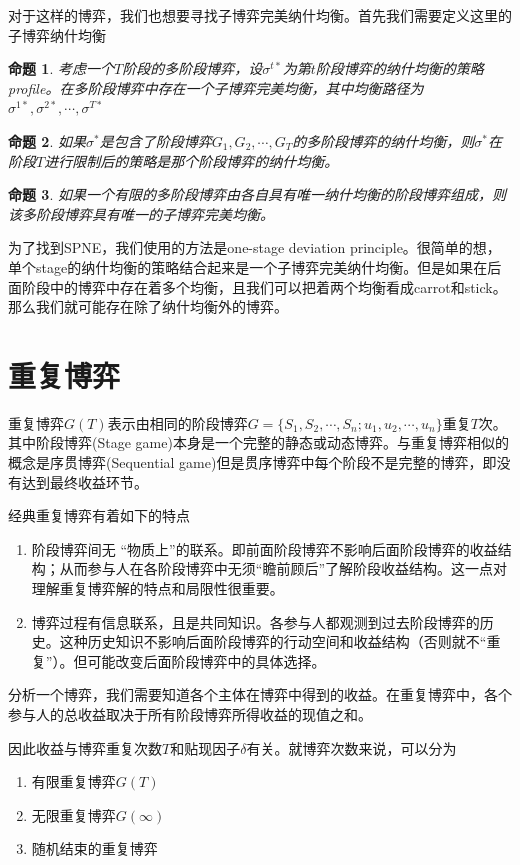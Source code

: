 \documentclass[UTF8,12pt]{ctexart}
\newtheorem{Prop}{命题}[section]
\numberwithin{equation}{section} %
\numberwithin{figure}{section}
\numberwithin{table}{section}
\begin{document}
	对于这样的博弈，我们也想要寻找子博弈完美纳什均衡。首先我们需要定义这里的子博弈纳什均衡
	\begin{Prop}
		考虑一个$T$阶段的多阶段博弈，设$\sigma^{t*}$为第$t$阶段博弈的纳什均衡的策略profile。在多阶段博弈中存在一个子博弈完美均衡，其中均衡路径为$\sigma^{1*},\sigma^{2*},\cdots,\sigma^{T*}$
	\end{Prop}
	\begin{Prop}
		如果$\sigma^*$是包含了阶段博弈$G_1,G_2,\cdots,G_T$的多阶段博弈的纳什均衡，则$\sigma^*$在阶段$T$进行限制后的策略是那个阶段博弈的纳什均衡。
	\end{Prop}
	\begin{Prop}
		如果一个有限的多阶段博弈由各自具有唯一纳什均衡的阶段博弈组成，则该多阶段博弈具有唯一的子博弈完美均衡。
	\end{Prop}
	
	为了找到SPNE，我们使用的方法是one-stage deviation principle。很简单的想，单个stage的纳什均衡的策略结合起来是一个子博弈完美纳什均衡。但是如果在后面阶段中的博弈中存在着多个均衡，且我们可以把着两个均衡看成carrot和stick。那么我们就可能存在除了纳什均衡外的博弈。
	
	\newpage
	
	\section{重复博弈}
	
	重复博弈$G(T)$表示由相同的阶段博弈$G = \{S_1,S_2,\cdots,S_n;u_1,u_2,\cdots,u_n\}$重复$T$次。其中阶段博弈(Stage game)本身是一个完整的静态或动态博弈。与重复博弈相似的概念是序贯博弈(Sequential game)但是贯序博弈中每个阶段不是完整的博弈，即没有达到最终收益环节。
	
	经典重复博弈有着如下的特点
	\begin{enumerate}
		\item 阶段博弈间无 “物质上”的联系。即前面阶段博弈不影响后面阶段博弈的收益结构；从而参与人在各阶段博弈中无须“瞻前顾后”了解阶段收益结构。这一点对理解重复博弈解的特点和局限性很重要。
		
		\item 博弈过程有信息联系，且是共同知识。各参与人都观测到过去阶段博弈的历史。这种历史知识不影响后面阶段博弈的行动空间和收益结构（否则就不“重复”）。但可能改变后面阶段博弈中的具体选择。
	\end{enumerate}
	
	分析一个博弈，我们需要知道各个主体在博弈中得到的收益。在重复博弈中，各个参与人的总收益取决于所有阶段博弈所得收益的现值之和。
	
	因此收益与博弈重复次数$T$和贴现因子$\delta$有关。就博弈次数来说，可以分为
	\begin{enumerate}
		\item 有限重复博弈$G(T)$
		
		\item 无限重复博弈$G(\infty)$
		
		\item 随机结束的重复博弈
	\end{enumerate}
	
\end{document}
